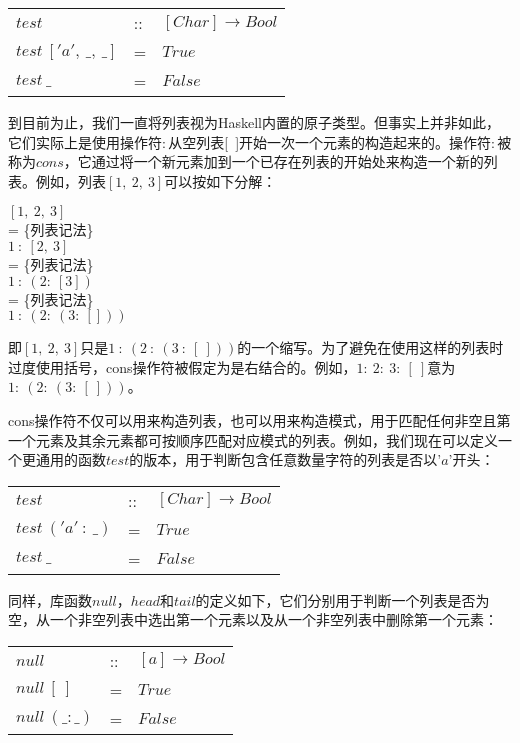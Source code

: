 \begin{tabular}[t]{lll}
$test$&::&$[Char] \rightarrow Bool$\\
$test~['a',~\_,~\_]$&=&$True$\\
$test~\_$&=&$False$\\
\end{tabular}

到目前为止，我们一直将列表视为Haskell内置的原子类型。但事实上并非如此，它们实际上是使用操作符$:$从空列表[~]开始一次一个元素的构造起来的。操作符$:$被称为$cons$，它通过将一个新元素加到一个已存在列表的开始处来构造一个新的列表。例如，列表$[1,~2,~3]$可以按如下分解：

\noindent\hspace*{1cm} $[1,~2,~3]$\\
\hspace*{1cm} = \{列表记法\}\\
\hspace*{1cm} $1~:~[2,~3]$\\
\hspace*{1cm} = \{列表记法\}\\
\hspace*{1cm} $1~:~(2:~[3])$\\
\hspace*{1cm} = \{列表记法\}\\
\hspace*{1cm} $1~:~(2:~(3:~[]))$

即$[1,~2,~3]$只是$1~:~(2~:~(3~:~[~]))$的一个缩写。为了避免在使用这样的列表时过度使用括号，cons操作符被假定为是右结合的。例如，$1:~2:~3:~[~]$意为$1:~(2:~
(3:~ [~]))$。

cons操作符不仅可以用来构造列表，也可以用来构造模式，用于匹配任何非空且第一个元素及其余元素都可按顺序匹配对应模式的列表。例如，我们现在可以定义一个更通用的函数$test$的版本，用于判断包含任意数量字符的列表是否以'$a$'开头： 

\begin{tabular}[t]{lll}
$test$&::&$[Char] \rightarrow Bool$\\
$test~('a'~:~\_)$&=&$True$\\
$test~\_$&=&$False$\\
\end{tabular}

同样，库函数$null$，$head$和$tail$的定义如下，它们分别用于判断一个列表是否为空，从一个非空列表中选出第一个元素以及从一个非空列表中删除第一个元素：

\begin{tabular}[t]{lll}
$null$&::&$[a] \rightarrow Bool$\\
$null~[~]$&=&$True$\\
$null~(\_:\_)$&=&$False$\\
\end{tabular}

